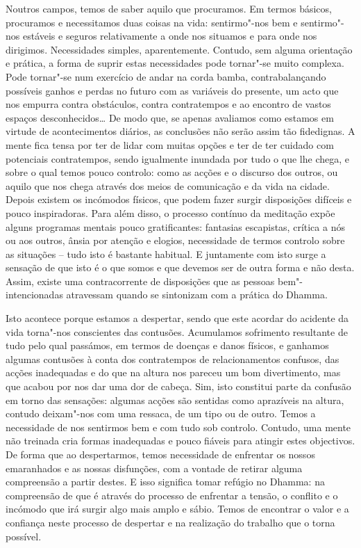 Noutros campos, temos de saber aquilo que procuramos. Em termos básicos,
procuramos e necessitamos duas coisas na vida: sentirmo"-nos bem e sentirmo"-nos
estáveis e seguros relativamente a onde nos situamos e para onde nos dirigimos.
Necessidades simples, aparentemente. Contudo, sem alguma orientação e prática, a
forma de suprir estas necessidades pode tornar"-se muito complexa. Pode
tornar"-se num exercício de andar na corda bamba, contrabalançando possíveis
ganhos e perdas no futuro com as variáveis do presente, um acto que nos empurra
contra obstáculos, contra contratempos e ao encontro de vastos espaços
desconhecidos\ldots{} De modo que, se apenas avaliamos como estamos em virtude
de acontecimentos diários, as conclusões não serão assim tão fidedignas. A mente
fica tensa por ter de lidar com muitas opções e ter de ter cuidado com
potenciais contratempos, sendo igualmente inundada por tudo o que lhe chega, e
sobre o qual temos pouco controlo: como as acções e o discurso dos outros, ou
aquilo que nos chega através dos meios de comunicação e da vida na cidade.
Depois existem os incómodos físicos, que podem fazer surgir disposições difíceis
e pouco inspiradoras. Para além disso, o processo contínuo da meditação expõe
alguns programas mentais pouco gratificantes: fantasias escapistas, crítica a
nós ou aos outros, ânsia por atenção e elogios, necessidade de termos controlo
sobre as situações -- tudo isto é bastante habitual. E juntamente com isto surge
a sensação de que isto é o que somos e que devemos ser de outra forma e não
desta. Assim, existe uma contracorrente de disposições que as pessoas
bem"-intencionadas atravessam quando se sintonizam com a prática do Dhamma.

Isto acontece porque estamos a despertar, sendo que este acordar do acidente da
vida torna"-nos conscientes das contusões. Acumulamos sofrimento resultante de
tudo pelo qual passámos, em termos de doenças e danos físicos, e ganhamos
algumas contusões à conta dos contratempos de relacionamentos confusos, das
acções inadequadas e do que na altura nos pareceu um bom divertimento, mas que
acabou por nos dar uma dor de cabeça. Sim, isto constitui parte da confusão em
torno das sensações: algumas acções são sentidas como aprazíveis na altura,
contudo deixam"-nos com uma ressaca, de um tipo ou de outro. Temos a necessidade
de nos sentirmos bem e com tudo sob controlo. Contudo, uma mente não treinada
cria formas inadequadas e pouco fiáveis para atingir estes objectivos. De forma
que ao despertarmos, temos necessidade de enfrentar os nossos emaranhados e as
nossas disfunções, com a vontade de retirar alguma compreensão a partir destes.
E isso significa tomar refúgio no Dhamma: na compreensão de que é através do
processo de enfrentar a tensão, o conflito e o incómodo que irá surgir algo mais
amplo e sábio. Temos de encontrar o valor e a confiança neste processo de
despertar e na realização do trabalho que o torna possível.

